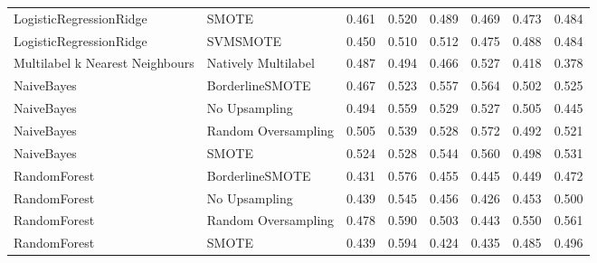 \begin{tabular}{llllllll}
        LogisticRegressionRidge &                         SMOTE & 0.461 &                     0.520 &                 0.489 &                  0.469 &                                   0.473 &     0.484 \\
        LogisticRegressionRidge &                      SVMSMOTE & 0.450 &                     0.510 &                 0.512 &                  0.475 &                                   0.488 &     0.484 \\
Multilabel k Nearest Neighbours &           Natively Multilabel & 0.487 &                     0.494 &                 0.466 &                  0.527 &                                   0.418 &     0.378 \\
                     NaiveBayes &               BorderlineSMOTE & 0.467 &                     0.523 &                 0.557 &                  0.564 &                                   0.502 &     0.525 \\
                     NaiveBayes &                 No Upsampling & 0.494 &                     0.559 &                 0.529 &                  0.527 &                                   0.505 &     0.445 \\
                     NaiveBayes &           Random Oversampling & 0.505 &                     0.539 &                 0.528 &                  0.572 &                                   0.492 &     0.521 \\
                     NaiveBayes &                         SMOTE & 0.524 &                     0.528 &                 0.544 &                  0.560 &                                   0.498 &     0.531 \\
                   RandomForest &               BorderlineSMOTE & 0.431 &                     0.576 &                 0.455 &                  0.445 &                                   0.449 &     0.472 \\
                   RandomForest &                 No Upsampling & 0.439 &                     0.545 &                 0.456 &                  0.426 &                                   0.453 &     0.500 \\
                   RandomForest &           Random Oversampling & 0.478 &                     0.590 &                 0.503 &                  0.443 &                                   0.550 &     0.561 \\
                   RandomForest &                         SMOTE & 0.439 &                     0.594 &                 0.424 &                  0.435 &                                   0.485 &     0.496 \\

\end{tabular}

